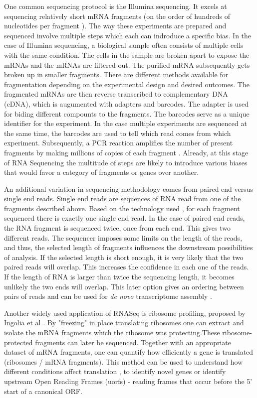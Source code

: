 \documentclass[12pt]{article}
\begin{document}
    One common sequencing protocol is the Illumina sequencing. It excels at sequencing relatively short mRNA fragments (on the order of hundreds of nucleotides per fragment \cite{Illumina, illuminaSeq}).  The way these experiments are prepared and sequenced involve multiple steps which each can indroduce a specific bias. In the case of Illumina sequencing, a biological sample often consists of multiple cells with the same condition. The cells in the sample are broken apart to expose the mRNAs and the mRNAs are filtered out. The purified mRNA subsequently gets broken up in smaller fragments. There are different methods available for fragmentation depending on the experimental design and desired outcomes. The fragmented mRNAs are then reverse transcribed to complementary DNA (cDNA), which is augumented with adapters and barcodes. The adapter is used for biding different compounts to the fragments. The barcodes serve as a unique identifier for the experiment. In the case multiple experiments are sequenced at the same time, the barcodes are used to tell which read comes from which experiment. Subsequently, a PCR reaction amplifies the number of present fragments by making millions of copies of each fragment \cite{Goswami2016}. Already, at this stage of RNA Sequencing the multitude of steps are likely to introduce various biases that would favor a category of fragments or genes over another.
    
    An additional variation in sequencing methodology comes from paired end versus single end reads. Single end reads are sequences of RNA read from one of the fragments described above. Based on the technology used \cite{Freedman2020}, for each fragment sequenced there is exactly one single end read. In the case of paired end reads, the RNA fragment is sequenced twice, once from each end. This gives two different reads. The sequencer imposes some limits on the length of the reads, and thus, the selected length of fragments influences the downstream possibilities of analysis. If the selected length is short enough, it is very likely that the two paired reads will overlap. This increases the confidence in each one of the reads. If the length of RNA is larger than twice the sequencing length, it becomes unlikely the two ends will overlap. This later option gives an ordering between pairs of reads and can be used for \textit{de novo} transcriptome assembly \cite{Hlzer2019}.
    
    Another widely used application of RNASeq is ribosome profiling, proposed by Ingolia et al \cite{Ingolia2012}. By "freezing" in place translating ribosomes one can extract and isolate the mRNA fragments which the ribosome was protecting.These ribosome-protected fragments can later be sequenced. Together with an appropriate dataset of mRNA fragments, one can quantify how efficiently a gene is translated (ribosomes / mRNA fragments). This method can be used to understand how different conditions affect translation \cite{Zhong2016, Chothani2019}, to identify novel genes or identify upstream Open Reading Frames (u\acrshort{orf}s) - reading frames that occur before the 5' start of a canonical \gls{ORF}.
    
\end{document}
